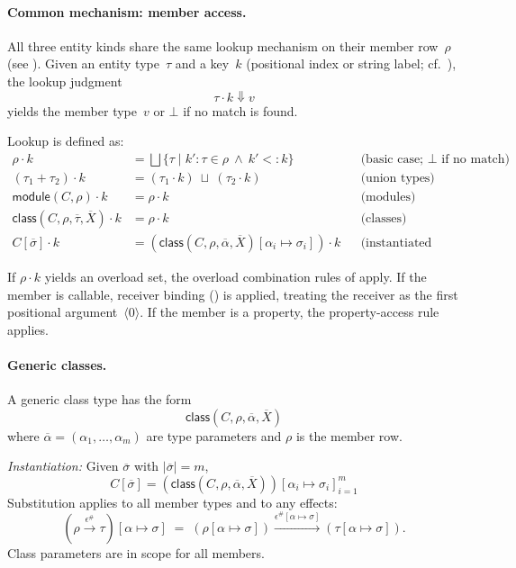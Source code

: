\paragraph{Common mechanism: member access.}
All three entity kinds share the same lookup mechanism on their member row~$\rho$ (see ).  
Given an entity type~$\tau$ and a key~$k$ (positional index or string label; cf.\ ), the lookup judgment
\[
\tau \cdot k \Downarrow v
\]
yields the member type~$v$ or $\bot$ if no match is found.

Lookup is defined as:
\begin{align*}
\rho \cdot k &= \bigsqcup \{\tau \mid k'{:}\tau \in \rho \ \wedge\ k' <: k \}
  &&\text{(basic case; $\bot$ if no match)}\\
(\tau_1 + \tau_2) \cdot k &= (\tau_1 \cdot k) \ \sqcup\ (\tau_2 \cdot k)
  &&\text{(union types)} \\
\mathsf{module}(C, \rho) \cdot k &= \rho \cdot k
  &&\text{(modules)}\\
\mathsf{class}(C, \rho, \overline{\tau}, \overline{X}) \cdot k &= \rho \cdot k
  &&\text{(classes)}\\
C[\overline{\sigma}] \cdot k &= (\mathsf{class}(C, \rho, \overline{\alpha}, \overline{X})[\alpha_i \mapsto \sigma_i]) \cdot k
  &&\text{(instantiated classes)}
\end{align*}

If $\rho \cdot k$ yields an overload set, the overload combination rules of  apply.  
If the member is callable, receiver binding () is applied, treating the receiver as the first positional argument~$\langle 0\rangle$.  
If the member is a property, the property-access rule applies.

\paragraph{Generic classes.}
A generic class type has the form
\[
\mathsf{class}(C, \rho, \overline{\alpha}, \overline{X})
\]
where $\overline{\alpha} = (\alpha_1,\dots,\alpha_m)$ are type parameters and $\rho$ is the member row.

\emph{Instantiation:} Given $\overline{\sigma}$ with $|\overline{\sigma}| = m$,
\[
C[\overline{\sigma}] = (\mathsf{class}(C, \rho, \overline{\alpha}, \overline{X}))[\alpha_i \mapsto \sigma_i]_{i=1}^m
\]
Substitution applies to all member types and to any effects:
\[
(\rho \xrightarrow{\epsilon^\#} \tau)[\alpha \mapsto \sigma] \;=\; (\rho[\alpha \mapsto \sigma]) \xrightarrow{\epsilon^\#[\alpha \mapsto \sigma]} (\tau[\alpha \mapsto \sigma]).
\]
Class parameters are in scope for all members.

